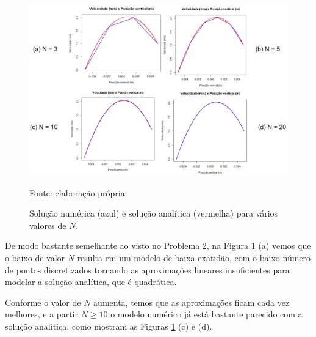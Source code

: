 \begin{figure}[h!]
    \caption{Solução numérica (azul) e solução analítica (vermelha) para vários valores de $N$.}
    \label{fig:graficoNumericoQ3}
    \centering
    \centerline{\includegraphics[scale=0.5]{graficoNumericoQ3.png}}
    \par{Fonte: elaboração própria.}
\end{figure}

De modo bastante semelhante ao visto no Problema 2, na Figura \ref*{fig:graficoNumericoQ3} (a) vemos que
o baixo de valor $N$ resulta em um modelo de baixa exatidão, com o baixo número de pontos discretizados tornando
as aproximações lineares insuficientes para modelar a solução analítica, que é quadrática.

Conforme o valor de $N$ aumenta, temos que as aproximações ficam cada vez melhores, e a partir $N \geq 10$ o modelo
numérico já está bastante parecido com a solução analítica, como mostram as Figuras \ref*{fig:graficoNumericoQ3} (c) e (d).